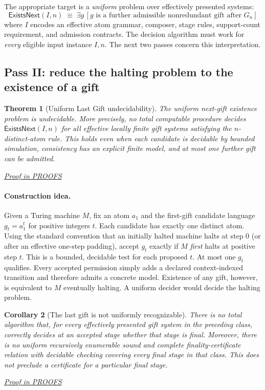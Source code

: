 \documentclass[11pt,letterpaper]{article}
\newtheorem{theorem}{Theorem}[section]
\newtheorem{corollary}[theorem]{Corollary}
\theoremstyle{definition}\newtheorem{definition}[theorem]{Definition}\newtheorem{example}[theorem]{Example}
\theoremstyle{remark}\newtheorem{remark}[theorem]{Remark}
\newcommand{\Exists}{\mathsf{ExistsNext}}
\newcommand{\proofat}[1]{\par\smallskip\noindent\hfill\textit{\hyperref[#1]{Proof in PROOFS}}}
\begin{document}
The appropriate target is a \emph{uniform} problem over effectively presented systems:
\[
\Exists(I,n)\;\equiv\;\exists g\,[g\text{ is a further admissible nonredundant gift after }G_n]
\]
where $I$ encodes an effective atom grammar, composer, stage rules, support-count requirement, and admission contracts. The decision algorithm must work for \emph{every} eligible input instance $I,n$. The next two passes concern this interpretation.

\subsection{Pass II: reduce the halting problem to the existence of a gift}
\begin{theorem}[Uniform Last Gift undecidability]\label{w0:thm:next}
The uniform next-gift existence problem is undecidable. More precisely, no total computable procedure decides $\Exists(I,n)$ for all effective locally finite gift systems satisfying the $n$-distinct-atom rule. This holds even when each candidate is decidable by bounded simulation, consistency has an explicit finite model, and at most one further gift can be admitted.\proofat{w0:pr:next}
\end{theorem}

\paragraph{Construction idea.} Given a Turing machine $M$, fix an atom $a_1$ and the first-gift candidate language $g_t=a_1^t$ for positive integers $t$. Each candidate has exactly one distinct atom. Using the standard convention that an initially halted machine halts at step $0$ (or after an effective one-step padding), accept $g_t$ exactly if $M$ \emph{first} halts at positive step $t$. This is a bounded, decidable test for each proposed $t$. At most one $g_t$ qualifies. Every accepted permission simply adds a declared context-indexed transition and therefore admits a concrete model. Existence of any gift, however, is equivalent to $M$ eventually halting. A uniform decider would decide the halting problem.

\begin{corollary}[The last gift is not uniformly recognizable]\label{w0:cor:last}
There is no total algorithm that, for every effectively presented gift system in the preceding class, correctly decides at an accepted stage whether that stage is final. Moreover, there is no uniform recursively enumerable \emph{sound and complete finality-certificate relation with decidable checking} covering every final stage in that class. This does not preclude a certificate for a particular final stage.\proofat{w0:pr:last}
\end{corollary}
\end{document}

